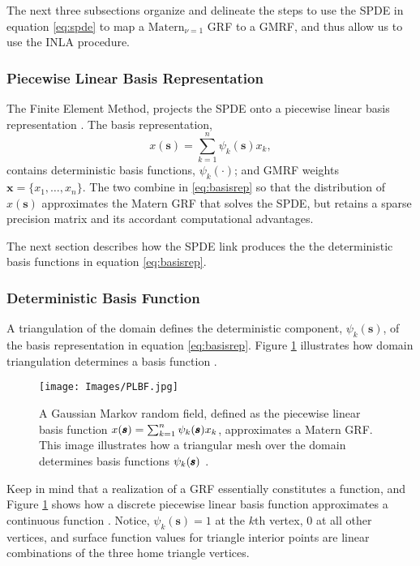 The next three subsections organize and delineate the steps to use the SPDE in equation \ref{eq:spde} to map a $\text{Matern}_{\nu = 1}$ GRF to a GMRF, and thus allow us to use the INLA procedure.

\subsubsection{Piecewise Linear Basis Representation}
The Finite Element Method, projects the SPDE onto a piecewise linear basis representation \citep{Simpson2012}. The basis representation,
\begin{equation} \label{eq:basisrep}
x(\pmb{s}) = \sum_{k=1}^{n} \psi_{k}(\pmb{s})x_{k},
\end{equation}
contains deterministic basis functions, $\psi_{k}(\cdot)$; and GMRF weights $\pmb{x} = \{x_{1},\dots,x_{n}\}$. The two combine in \ref{eq:basisrep} so that the distribution of $x(\pmb{s})$ approximates the Matern GRF that solves the SPDE, but retains a sparse precision matrix and its accordant computational advantages. 

The next section describes how the SPDE link produces the the deterministic basis functions in equation \ref{eq:basisrep}.

\subsubsection{Deterministic Basis Function}

A triangulation of the domain defines the deterministic component, $\psi_{k}(\pmb{s})$, of the basis representation in equation \ref{eq:basisrep}. Figure \ref{fig:basis} illustrates how domain triangulation determines a basis function \citep{Simpson2012}.
  \begin{figure}[H]
	\centering 
	\texttt{[image: Images/PLBF.jpg]}
	\caption{A Gaussian Markov random field, defined as the piecewise linear basis function $  x(\pmb{s}) = \sum_{k=1}^{n} \protect\psi_{k}(\pmb{s})x_{k}$, approximates a Matern GRF. This image illustrates how a triangular mesh over the domain determines basis functions $\protect\psi_{k}(\pmb{s})$ 
	\citep{Simpson2012}.}
	\label{fig:basis}
	\end{figure}
Keep in mind that a realization of a GRF essentially constitutes a function, and Figure \ref{fig:basis} shows how a discrete piecewise linear basis function approximates a continuous function \citep{Simpson2012}. Notice, $\psi_{k}(\pmb{s}) = 1$ at the $k\text{th}$ vertex, $0$ at all other vertices, and surface function values for triangle interior points are linear combinations of the three home triangle vertices.
 
